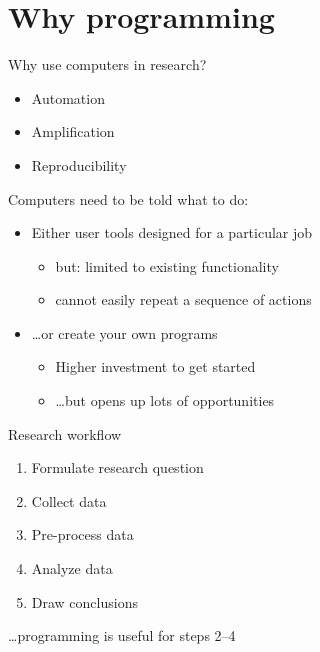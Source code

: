 \documentclass{beamer}
\begin{document}
\section{Why programming}
\frame{\tableofcontents[currentsection]}


\begin{frame}
    Why use computers in research?
    \begin{itemize}
        \item Automation
        \item Amplification
        \item Reproducibility
    \end{itemize}

    \pause
    Computers need to be told what to do:

    \begin{itemize}
    \item Either user tools designed for a particular job
        \begin{itemize}
            \item but: limited to existing functionality
            \item cannot easily repeat a sequence of actions
        \end{itemize}

    \item \dots or create your own programs
        \begin{itemize}
            \item Higher investment to get started
            \item \dots but opens up lots of opportunities
        \end{itemize}
    \end{itemize}
\end{frame}


\begin{frame}{Research workflow}
    \begin{enumerate}
        \item Formulate research question
        \item Collect data
        \item Pre-process data
        \item Analyze data
        \item Draw conclusions
    \end{enumerate}

    \pause
    \dots programming is useful for steps 2--4
\end{frame}
\end{document}
